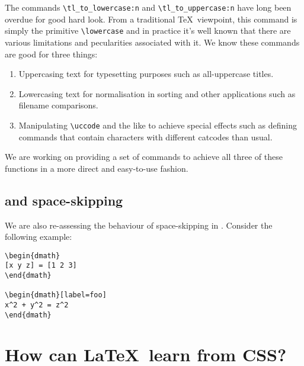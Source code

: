 \documentclass{ltnews}
\begin{document}
The commands \verb"\tl_to_lowercase:n" and \verb"\tl_to_uppercase:n" have long been overdue for good hard look.
From a traditional \TeX\ viewpoint, this command is simply the primitive \verb"\lowercase" and in practice it's well known that there are various limitations and pecularities associated with it.
We know these commands are good for three things:
\begin{enumerate}
\item
Uppercasing text for typesetting purposes such as all-uppercase titles.
\item
Lowercasing text for normalisation in sorting and other applications such as filename comparisons.
\item
Manipulating \verb"\uccode" and the like to achieve special effects such as defining commands that contain characters with different catcodes than usual.
\end{enumerate}
We are working on providing a set of commands to achieve all three of these functions in a more direct and easy-to-use fashion.

\subsection{ and space-skipping}

We are also re-assessing the behaviour of space-skipping in .
Consider the following example:
\begin{multicols}{2}
\begin{verbatim}
\begin{dmath}
[x y z] = [1 2 3]
\end{dmath}

\begin{dmath}[label=foo]
x^2 + y^2 = z^2
\end{dmath}
\end{verbatim}
\end{multicols}


\section{How can \LaTeX\ learn from CSS?}
\end{document}
